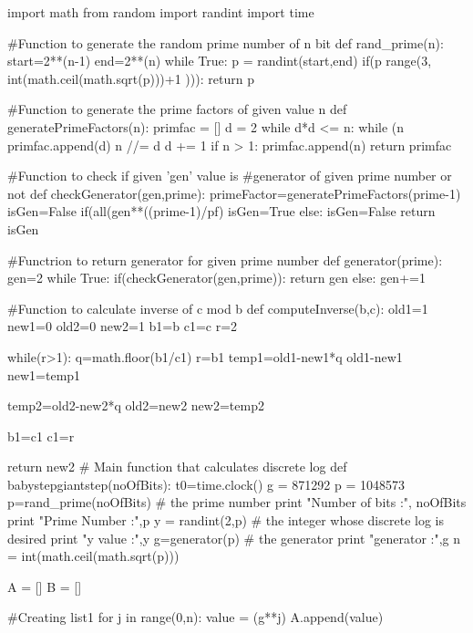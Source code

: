 \documentclass{article}
\begin{document}
\begin{python}

import math
from random import randint
import time

#Function to generate the random prime number of n bit
def rand_prime(n):
    start=2**(n-1)
    end=2**(n)
    while True:
        p = randint(start,end)
        if(p %
            range(3, int(math.ceil(math.sqrt(p)))+1 ))):
            return p

#Function to generate the prime factors of given value n
def generatePrimeFactors(n):
    primfac = []
    d = 2
    while d*d <= n:
        while (n %
            primfac.append(d)
            n //= d
        d += 1
    if n > 1:
       primfac.append(n)
    return primfac

#Function to check if given 'gen' value is 
#generator of given prime number or not
def checkGenerator(gen,prime):
    primeFactor=generatePrimeFactors(prime-1)
    isGen=False
    if(all(gen**((prime-1)/pf) %
        isGen=True
    else:
        isGen=False
    return isGen

#Functrion to return generator for given prime number
def generator(prime):
    gen=2
    while True:
        if(checkGenerator(gen,prime)):
            return gen
        else:
            gen+=1

#Function to calculate inverse of c mod b
def computeInverse(b,c):
    old1=1
    new1=0
    old2=0
    new2=1
    b1=b
    c1=c
    r=2

    while(r>1):
        q=math.floor(b1/c1)
        r=b1%
        temp1=old1-new1*q
        old1-new1
        new1=temp1

        temp2=old2-new2*q
        old2=new2
        new2=temp2

        b1=c1
        c1=r

    return new2    
# Main function that calculates discrete log
def babystepgiantstep(noOfBits):
    t0=time.clock()
    g = 871292   
    p = 1048573 
    p=rand_prime(noOfBits)  # the prime number
    print "Number of bits :", noOfBits
    print "Prime Number :",p
    y = randint(2,p)  # the integer whose discrete log is desired
    print "y value :",y
    g=generator(p)  # the generator
    print "generator :",g
    n = int(math.ceil(math.sqrt(p)))  
 
    A = []
    B = []

    #Creating list1
    for j in range(0,n):
        value = (g**j) %
        A.append(value)


\end{python}
\end{document}
